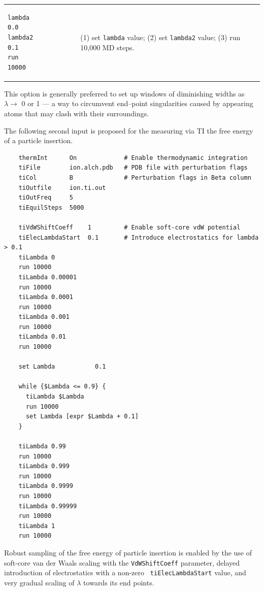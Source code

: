 \begin{tabular}{ll}
\begin{minipage}{8cm}
\begin{verbatim}
lambda          0.0
lambda2         0.1
run             10000
\end{verbatim}
\end{minipage}
&
\begin{minipage}{7.8cm}
(1) set {\tt lambda} value;
\newline
(2) set {\tt lambda2} value;
\newline
(3) run 10,000 MD steps.
\end{minipage}
\end{tabular}


This option is generally preferred to set up windows of diminishing
widths as $\lambda \rightarrow$ 0 or 1 --- a way to circumvent
end--point singularities caused by appearing atoms that may
clash with their surroundings.


The following second input is proposed for the measuring via TI the free energy
of a particle insertion.

\begin{verbatim}
    thermInt      On             # Enable thermodynamic integration
    tiFile        ion.alch.pdb   # PDB file with perturbation flags
    tiCol         B              # Perturbation flags in Beta column
    tiOutfile     ion.ti.out
    tiOutFreq     5
    tiEquilSteps  5000

    tiVdWShiftCoeff    1         # Enable soft-core vdW potential
    tiElecLambdaStart  0.1       # Introduce electrostatics for lambda > 0.1
    tiLambda 0
    run 10000
    tiLambda 0.00001
    run 10000
    tiLambda 0.0001
    run 10000
    tiLambda 0.001
    run 10000
    tiLambda 0.01
    run 10000

    set Lambda           0.1

    while {$Lambda <= 0.9} {
      tiLambda $Lambda
      run 10000
      set Lambda [expr $Lambda + 0.1]
    }

    tiLambda 0.99
    run 10000
    tiLambda 0.999
    run 10000
    tiLambda 0.9999
    run 10000
    tiLambda 0.99999
    run 10000
    tiLambda 1
    run 10000

\end{verbatim}

Robust
sampling of the free energy of particle insertion is enabled by the use of
soft-core van der Waals scaling with the {\tt VdWShiftCoeff} parameter,
delayed introduction of electrostatics with a non-zero {\tt
tiElecLambdaStart} value, and very gradual scaling of $\lambda$ towards its
end points.




